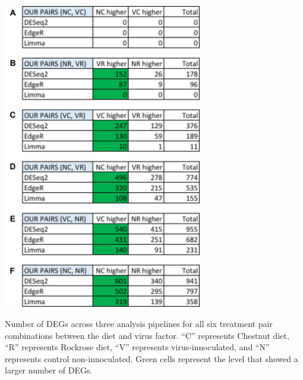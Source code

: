 \documentclass[11pt,a4paper,oldfontcommands,openany]{memoir}
\numberwithin{equation}{section} %
\begin{document}
\begin{table}[H]
\centering
  \includegraphics[width=0.65\textwidth]{Images/pairDEGs}
  \caption{Number of DEGs across three analysis pipelines for all six treatment pair combinations between the diet and virus factor. ``C'' represents Chestnut diet, ``R'' represents Rockrose diet, ``V'' represents virus-innoculated, and ``N'' represents control non-innoculated. Green cells represent the level that showed a larger number of DEGs.}
  \label{tbl:pairDEGs}
\end{table}
\end{document}
